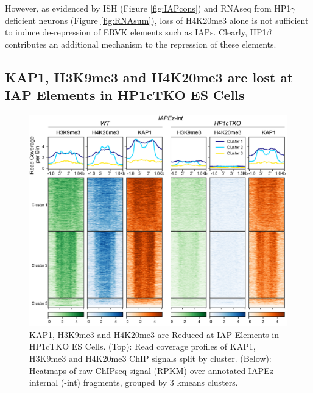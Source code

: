 \documentclass[onehalf,12pt]{beavtex}
\begin{document}
  \FloatBarrier
  
  However, as evidenced by ISH (Figure \ref{fig:IAPcons}) and RNAseq from
  HP1\(\gamma\) deficient neurons (Figure \ref{fig:RNAsum}), loss of
  H4K20me3 alone is not sufficient to induce de-repression of ERVK
  elements such as IAPs. Clearly, HP1\(\beta\) contributes an additional
  mechanism to the repression of these elements.
  
  \subsection{KAP1, H3K9me3 and H4K20me3 are lost at IAP Elements in
  HP1cTKO ES
  Cells}\label{kap1-h3k9me3-and-h4k20me3-are-lost-at-iap-elements-in-hp1ctko-es-cells}
  
  \begin{figure}
  
  {\centering \includegraphics[width=1\linewidth, ]{./figure/results/IAPEz-int_h3k9me3_H4K20me3} 
  
  }
  
  \caption[KAP1, H3K9me3 and H4K20me3 are Reduced at IAP Elements in HP1cTKO ES Cells]{KAP1, H3K9me3 and H4K20me3 are Reduced at IAP Elements in HP1cTKO ES Cells. (Top): Read coverage profiles of KAP1, H3K9me3 and H4K20me3 ChIP signals split by cluster. (Below): Heatmaps of raw ChIPseq signal (RPKM) over annotated IAPEz internal (-int) fragments, grouped by 3 kmeans clusters.}\label{fig:IAPH3K9}
  \end{figure}
  
  \FloatBarrier
  
\end{document}
